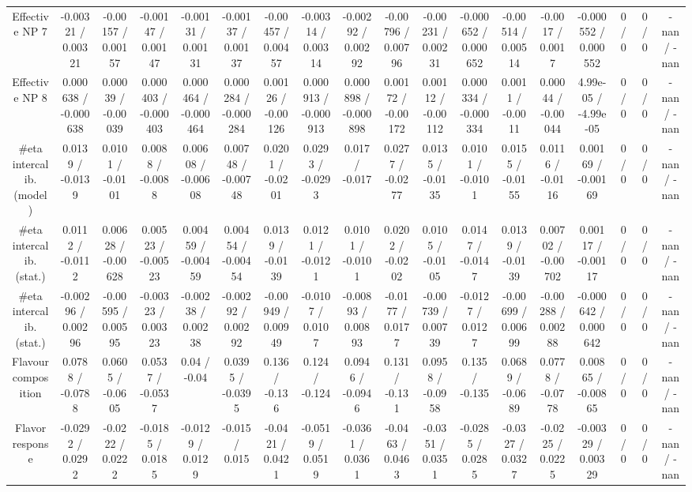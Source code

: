 \documentclass[10pt]{article}
\begin{document}
\begin{table}[htbp]
\begin{center}
\begin{tabular}{|c|c|c|c|c|c|c|c|c|c|c|c|c|c|c|c|c|c|}
  Effective NP 7 & -0.00321 / 0.00321 & -0.00157 / 0.00157 & -0.00147 / 0.00147 & -0.00131 / 0.00131 & -0.00137 / 0.00137 & -0.00457 / 0.00457 & -0.00314 / 0.00314 & -0.00292 / 0.00292 & -0.00796 / 0.00796 & -0.00231 / 0.00231 & -0.000652 / 0.000652 & -0.00514 / 0.00514 & -0.0017 / 0.0017 & -0.000552 / 0.000552 & 0 / 0 & 0 / 0 & -nan / -nan \\ 
  Effective NP 8 & 0.000638 / -0.000638 & 0.00039 / -0.00039 & 0.000403 / -0.000403 & 0.000464 / -0.000464 & 0.000284 / -0.000284 & 0.00126 / -0.00126 & 0.000913 / -0.000913 & 0.000898 / -0.000898 & 0.00172 / -0.00172 & 0.00112 / -0.00112 & 0.000334 / -0.000334 & 0.0011 / -0.0011 & 0.00044 / -0.00044 & 4.99e-05 / -4.99e-05 & 0 / 0 & 0 / 0 & -nan / -nan \\ 
  #eta intercalib. (model) & 0.0139 / -0.0139 & 0.0101 / -0.0101 & 0.0088 / -0.0088 & 0.00608 / -0.00608 & 0.00748 / -0.00748 & 0.0201 / -0.0201 & 0.0293 / -0.0293 & 0.017 / -0.017 & 0.0277 / -0.0277 & 0.0135 / -0.0135 & 0.0101 / -0.0101 & 0.0155 / -0.0155 & 0.0116 / -0.0116 & 0.00169 / -0.00169 & 0 / 0 & 0 / 0 & -nan / -nan \\ 
  #eta intercalib. (stat.) & 0.0112 / -0.0112 & 0.00628 / -0.00628 & 0.00523 / -0.00523 & 0.00459 / -0.00459 & 0.00454 / -0.00454 & 0.0139 / -0.0139 & 0.0121 / -0.0121 & 0.0101 / -0.0101 & 0.0202 / -0.0202 & 0.0105 / -0.0105 & 0.0147 / -0.0147 & 0.0139 / -0.0139 & 0.00702 / -0.00702 & 0.00117 / -0.00117 & 0 / 0 & 0 / 0 & -nan / -nan \\ 
  #eta intercalib. (stat.) & -0.00296 / 0.00296 & -0.00595 / 0.00595 & -0.00323 / 0.00323 & -0.00238 / 0.00238 & -0.00292 / 0.00292 & -0.00949 / 0.00949 & -0.0107 / 0.0107 & -0.00893 / 0.00893 & -0.0177 / 0.0177 & -0.00739 / 0.00739 & -0.0127 / 0.0127 & -0.00699 / 0.00699 & -0.00288 / 0.00288 & -0.000642 / 0.000642 & 0 / 0 & 0 / 0 & -nan / -nan \\ 
  Flavour composition & 0.0788 / -0.0788 & 0.0605 / -0.0605 & 0.0537 / -0.0537 & 0.04 / -0.04 & 0.0395 / -0.0395 & 0.136 / -0.136 & 0.124 / -0.124 & 0.0946 / -0.0946 & 0.131 / -0.131 & 0.0958 / -0.0958 & 0.135 / -0.135 & 0.0689 / -0.0689 & 0.0778 / -0.0778 & 0.00865 / -0.00865 & 0 / 0 & 0 / 0 & -nan / -nan \\ 
  Flavor response & -0.0292 / 0.0292 & -0.0222 / 0.0222 & -0.0185 / 0.0185 & -0.0129 / 0.0129 & -0.015 / 0.015 & -0.0421 / 0.0421 & -0.0519 / 0.0519 & -0.0361 / 0.0361 & -0.0463 / 0.0463 & -0.0351 / 0.0351 & -0.0285 / 0.0285 & -0.0327 / 0.0327 & -0.0225 / 0.0225 & -0.00329 / 0.00329 & 0 / 0 & 0 / 0 & -nan / -nan \\ 

\end{tabular}
\end{center}
\end{table}
\end{document}

